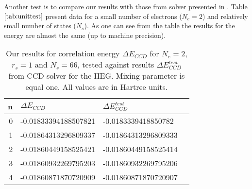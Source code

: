 \documentclass[twoside,english]{uiofysmaster}
\theoremstyle{definition}
\begin{document}
Another test is to compare our results with those from solver presented in \cite{hjorth-jensenAdvancedCourseComputational2017}. Table $\ref{tab:unittest}$ present data for a small number of electrons ($N_e=2$) and relatively small number of states ($N_s$). As one can see from the table the results for the energy are almost the same (up to machine precision).
\begin{table}[h]
	\centering
	\captionsetup{width=.8\textwidth}
	\caption{Our results for correlation energy $\Delta E_{CCD}$  for $N_e=2$, $r_s=1$ and $N_s=66$,   tested against results  $\Delta E_{CCD}^{test}$ from \cite{hjorth-jensenAdvancedCourseComputational2017} CCD solver for the HEG. Mixing parameter is equal one. All values are in Hartree units.}
	\begin{tabular}{rlll}
		n & $\Delta E_{CCD}$     &   $\Delta E_{CCD}^{test}$  \\ \hline
		0 & -0.01833394188507821 & -0.0183339418850782  \\
		1 & -0.01864313296809337 & -0.01864313296809333 \\
		2 & -0.01860449158525421 & -0.01860449158525414 \\
		3 & -0.01860932269795203 & -0.01860932269795206 \\
		4 & -0.01860871870720909 & -0.01860871870720907 \\
	\end{tabular}
	\label{tab:unittest}
\end{table}
\end{document}
